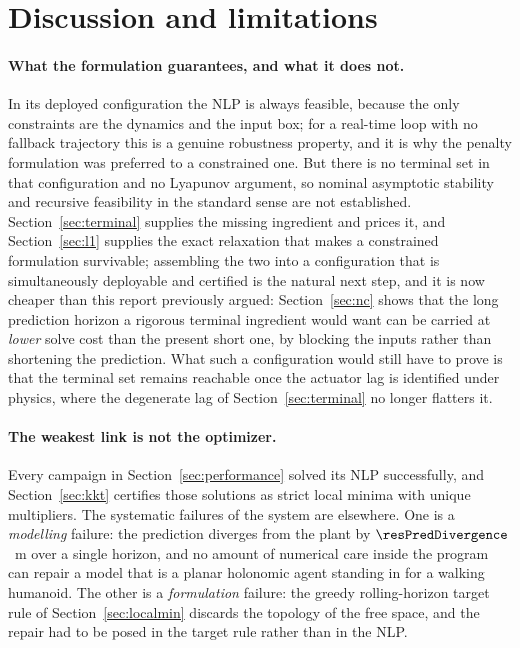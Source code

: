 \documentclass[11pt,a4paper]{article}
\begin{document}
\section{Discussion and limitations}
\label{sec:discussion}

\paragraph{What the formulation guarantees, and what it does not.} In its deployed configuration the NLP is
always feasible, because the only constraints are the dynamics and the input box; for a real-time loop with
no fallback trajectory this is a genuine robustness property, and it is why the penalty formulation was
preferred to a constrained one. But there is no terminal set in that configuration and no Lyapunov argument,
so nominal asymptotic stability and recursive feasibility in the standard sense
\cite{mayne2000constrained} are not established. Section~\ref{sec:terminal} supplies the missing ingredient
and prices it, and Section~\ref{sec:l1} supplies the exact relaxation that makes a constrained formulation
survivable; assembling the two into a configuration that is simultaneously deployable and certified is the
natural next step, and it is now cheaper than this report previously argued: Section~\ref{sec:nc} shows that
the long prediction horizon a rigorous terminal ingredient would want can be carried at \emph{lower} solve
cost than the present short one, by blocking the inputs rather than shortening the prediction. What such a
configuration would still have to prove is that the terminal set remains reachable once the actuator lag is
identified under physics, where the degenerate lag of Section~\ref{sec:terminal} no longer flatters it.

\paragraph{The weakest link is not the optimizer.} Every campaign in Section~\ref{sec:performance} solved its
NLP successfully, and Section~\ref{sec:kkt} certifies those solutions as strict local minima with unique
multipliers. The systematic failures of the system are elsewhere. One is a \emph{modelling} failure: the
prediction diverges from the plant by $\resPredDivergence$~m over a single horizon, and no amount of
numerical care inside the program can repair a model that is a planar holonomic agent standing in for a
walking humanoid. The other is a \emph{formulation} failure: the greedy rolling-horizon target rule of
Section~\ref{sec:localmin} discards the topology of the free space, and the repair had to be posed in the
target rule rather than in the NLP.
\end{document}

